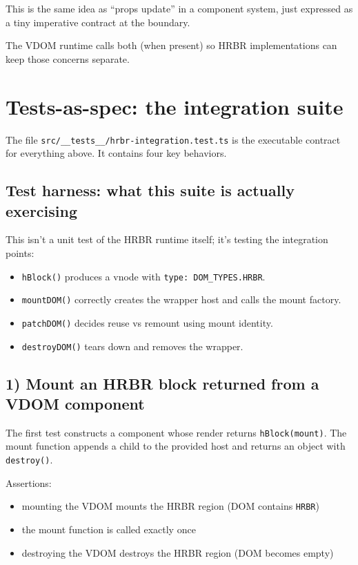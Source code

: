 This is the same idea as ``props update'' in a component system, just expressed as a tiny imperative contract at the boundary.

The VDOM runtime calls both (when present) so HRBR implementations can keep those concerns separate.

\section{Tests-as-spec: the integration suite}

The file \texttt{src/\_\_tests\_\_/hrbr-integration.test.ts} is the executable contract for everything above.
It contains four key behaviors.

\subsection{Test harness: what this suite is actually exercising}

This isn't a unit test of the HRBR runtime itself; it's testing the integration points:

\begin{itemize}
\item \texttt{hBlock()} produces a vnode with \texttt{type: DOM\_TYPES.HRBR}.
\item \texttt{mountDOM()} correctly creates the wrapper host and calls the mount factory.
\item \texttt{patchDOM()} decides reuse vs remount using mount identity.
\item \texttt{destroyDOM()} tears down and removes the wrapper.
\end{itemize}

\subsection{1) Mount an HRBR block returned from a VDOM component}

The first test constructs a component whose render returns \texttt{hBlock(mount)}.
The mount function appends a child to the provided host and returns an object with \texttt{destroy()}.

Assertions:

\begin{itemize}
\item mounting the VDOM mounts the HRBR region (DOM contains \texttt{HRBR})
\item the mount function is called exactly once
\item destroying the VDOM destroys the HRBR region (DOM becomes empty)
\end{itemize}

